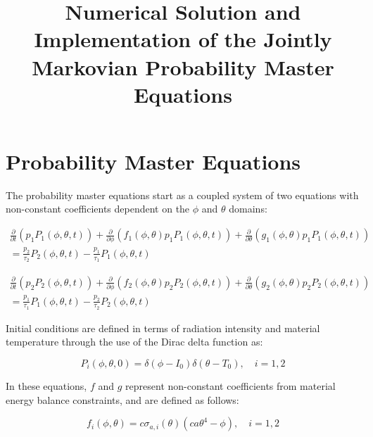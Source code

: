 \documentclass[12pt,a4paper,pagesize=pdftex]{scrartcl}
\title{Numerical Solution and Implementation of the Jointly Markovian Probability Master Equations}
\subtitle{}
\author{}
\date{}
\begin{document}
\pdfpageheight 11in
\pdfpagewidth 8.5in

\maketitle

\section*{Probability Master Equations}
The probability master equations start as a coupled system of two equations with non-constant coefficients dependent on the \(\phi\) and \(\theta\) domains:

\begin{multline*}
    \frac{\partial}{\partial t} \left(p_1 P_1 \left(\phi, \theta, t\right)\right) + \frac{\partial}{\partial \phi} \left(f_1\left(\phi, \theta\right) p_1 P_1 \left(\phi, \theta, t\right)\right) + \frac{\partial}{\partial \theta} \left(g_1 \left(\phi, \theta\right) p_1 P_1\left(\phi, \theta, t\right)\right) \\= \frac{p_2}{\tau_2} P_2 \left(\phi, \theta, t\right) - \frac{p_1}{\tau_1} P_1\left(\phi, \theta, t\right)
\end{multline*}

\begin{multline*}
    \frac{\partial}{\partial t} \left(p_2 P_2 \left(\phi, \theta, t\right) \right) + \frac{\partial}{\partial \phi} \left(f_2 \left(\phi, \theta\right) p_2 P_2 \left(\phi, \theta, t\right)\right) + \frac{\partial}{\partial \theta} \left(g_2 \left(\phi, \theta\right) p_2 P_2\left(\phi, \theta, t\right)\right) \\= \frac{p_1}{\tau_1} P_1\left(\phi, \theta, t\right) - \frac{p_2}{\tau_2} P_2\left(\phi, \theta, t\right)
\end{multline*}

Initial conditions are defined in terms of radiation intensity and material temperature through the use of the Dirac delta function as:

\begin{equation*}
    P_i\left(\phi, \theta, 0\right) = \delta\left(\phi - I_0\right) \delta\left(\theta - T_0\right), \quad i = 1, 2
\end{equation*}

In these equations, \(f\) and \(g\) represent non-constant coefficients from material energy balance constraints, and are defined as follows:

\begin{equation*}
    f_i\left(\phi, \theta\right) = c \sigma_{a,i}\left(\theta\right) \left(c a \theta^4 - \phi\right), \quad i = 1, 2
\end{equation*}
\end{document}
